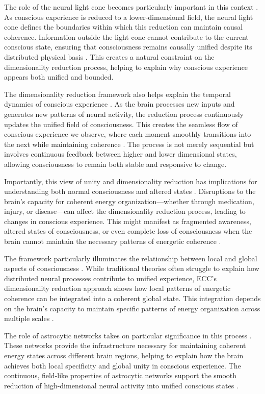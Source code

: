 \begin{refsection}
The role of the neural light cone becomes particularly important in this context \cite{james1890principles}. As conscious experience is reduced to a lower-dimensional field, the neural light cone defines the boundaries within which this reduction can maintain causal coherence. Information outside the light cone cannot contribute to the current conscious state, ensuring that consciousness remains causally unified despite its distributed physical basis \cite{revonsuo2006inner}. This creates a natural constraint on the dimensionality reduction process, helping to explain why conscious experience appears both unified and bounded.

The dimensionality reduction framework also helps explain the temporal dynamics of conscious experience \cite{varela1999present}. As the brain processes new inputs and generates new patterns of neural activity, the reduction process continuously updates the unified field of consciousness. This creates the seamless flow of conscious experience we observe, where each moment smoothly transitions into the next while maintaining coherence \cite{dainton2006stream}. The process is not merely sequential but involves continuous feedback between higher and lower dimensional states, allowing consciousness to remain both stable and responsive to change.

Importantly, this view of unity and dimensionality reduction has implications for understanding both normal consciousness and altered states \cite{carhart2014entropic}. Disruptions to the brain's capacity for coherent energy organization—whether through medication, injury, or disease—can affect the dimensionality reduction process, leading to changes in conscious experience. This might manifest as fragmented awareness, altered states of consciousness, or even complete loss of consciousness when the brain cannot maintain the necessary patterns of energetic coherence \cite{baars2002conscious}.

The framework particularly illuminates the relationship between local and global aspects of consciousness \cite{bayne2010unity}. While traditional theories often struggle to explain how distributed neural processes contribute to unified experience, ECC's dimensionality reduction approach shows how local patterns of energetic coherence can be integrated into a coherent global state. This integration depends on the brain's capacity to maintain specific patterns of energy organization across multiple scales \cite{mashour2020conscious}.

The role of astrocytic networks takes on particular significance in this process \cite{koch2017can}. These networks provide the infrastructure necessary for maintaining coherent energy states across different brain regions, helping to explain how the brain achieves both local specificity and global unity in conscious experience. The continuous, field-like properties of astrocytic networks support the smooth reduction of high-dimensional neural activity into unified conscious states \cite{hameroff2014consciousness}.


\end{refsection}
